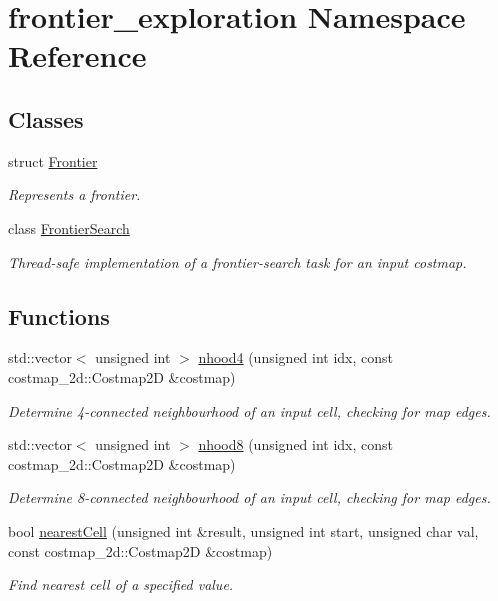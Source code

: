 \hypertarget{namespacefrontier__exploration}{}\section{frontier\+\_\+exploration Namespace Reference}
\label{namespacefrontier__exploration}
\subsection*{Classes}
\begin{DoxyCompactItemize}
\item 
struct \hyperlink{structfrontier__exploration_1_1Frontier}{Frontier}
\begin{DoxyCompactList}\small\item\em Represents a frontier. \end{DoxyCompactList}\item 
class \hyperlink{classfrontier__exploration_1_1FrontierSearch}{Frontier\+Search}
\begin{DoxyCompactList}\small\item\em Thread-\/safe implementation of a frontier-\/search task for an input costmap. \end{DoxyCompactList}\end{DoxyCompactItemize}
\subsection*{Functions}
\begin{DoxyCompactItemize}
\item 
std\+::vector$<$ unsigned int $>$ \hyperlink{namespacefrontier__exploration_affc5c02b52db13456c62dc5f707efa6f}{nhood4} (unsigned int idx, const costmap\+\_\+2d\+::\+Costmap2D \&costmap)
\begin{DoxyCompactList}\small\item\em Determine 4-\/connected neighbourhood of an input cell, checking for map edges. \end{DoxyCompactList}\item 
std\+::vector$<$ unsigned int $>$ \hyperlink{namespacefrontier__exploration_aff5530dc70914d4cfde4f455ecaa0cd6}{nhood8} (unsigned int idx, const costmap\+\_\+2d\+::\+Costmap2D \&costmap)
\begin{DoxyCompactList}\small\item\em Determine 8-\/connected neighbourhood of an input cell, checking for map edges. \end{DoxyCompactList}\item 
bool \hyperlink{namespacefrontier__exploration_a1919c053e430083b7fb366501fff518c}{nearest\+Cell} (unsigned int \&result, unsigned int start, unsigned char val, const costmap\+\_\+2d\+::\+Costmap2D \&costmap)
\begin{DoxyCompactList}\small\item\em Find nearest cell of a specified value. \end{DoxyCompactList}\end{DoxyCompactItemize}


